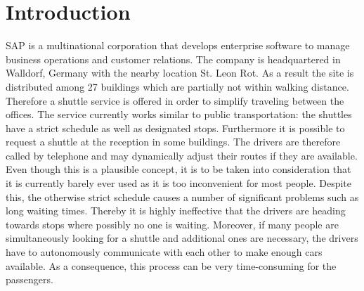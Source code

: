 

\pagestyle{plain}
\chapter{Introduction}
\label{cha:Introduction}

SAP is a multinational corporation that develops enterprise software to manage
business operations and customer relations. \cite{company} The company is
headquartered in Walldorf, Germany with the nearby location St. Leon Rot. As a
result the site is distributed among 27 buildings which are partially not within
walking distance.
Therefore a shuttle service is offered in order to simplify traveling between
the offices.
\newline The service currently works similar to public transportation:
the shuttles have a strict schedule as well as designated stops.
Furthermore it is possible to request a shuttle at the reception in some
buildings.
The drivers are therefore called by telephone and may dynamically adjust their
routes if they are available. \newline Even though this is a plausible concept,
it is to be taken into consideration that it is currently barely ever used as it
is too inconvenient for most people.
Despite this, the otherwise strict schedule causes a number of significant
problems such as long waiting times. Thereby it is highly ineffective that the
drivers are heading towards stops where possibly no one is waiting.
Moreover, if many people are simultaneously looking for a shuttle and additional
ones are necessary, the drivers have to autonomously communicate with each other
to make enough cars available. As a consequence, this process can be very
time-consuming for the passengers.
\newline 

